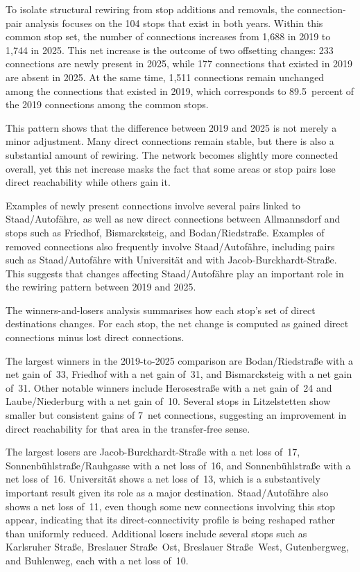 \documentclass[12pt,a4paper,oneside]{report}
\begin{document}
To isolate structural rewiring from stop additions and removals, the connection-pair analysis focuses on the 104 stops that exist in both years.
Within this common stop set, the number of connections increases from 1,688 in 2019 to 1,744 in 2025.
This net increase is the outcome of two offsetting changes: 233 connections are newly present in 2025, while 177 connections that existed in 2019 are absent in 2025.
At the same time, 1,511 connections remain unchanged among the connections that existed in 2019, which corresponds to 89.5~percent of the 2019 connections among the common stops.

This pattern shows that the difference between 2019 and 2025 is not merely a minor adjustment.
Many direct connections remain stable, but there is also a substantial amount of rewiring.
The network becomes slightly more connected overall, yet this net increase masks the fact that some areas or stop pairs lose direct reachability while others gain it.

Examples of newly present connections involve several pairs linked to Staad/Autof\"{a}hre, as well as new direct connections between Allmannsdorf and stops such as Friedhof, Bismarcksteig, and Bodan/Riedstra\ss{}e.
Examples of removed connections also frequently involve Staad/Autof\"{a}hre, including pairs such as Staad/Autof\"{a}hre with Universit\"{a}t and with Jacob-Burckhardt-Stra\ss{}e.
This suggests that changes affecting Staad/Autof\"{a}hre play an important role in the rewiring pattern between 2019 and 2025.

The winners-and-losers analysis summarises how each stop's set of direct destinations changes.
For each stop, the net change is computed as gained direct connections minus lost direct connections.

The largest winners in the 2019-to-2025 comparison are Bodan/Riedstra\ss{}e with a net gain of~33, Friedhof with a net gain of~31, and Bismarcksteig with a net gain of~31.
Other notable winners include Herosestra\ss{}e with a net gain of~24 and Laube/Niederburg with a net gain of~10.
Several stops in Litzelstetten show smaller but consistent gains of 7~net connections, suggesting an improvement in direct reachability for that area in the transfer-free sense.

The largest losers are Jacob-Burckhardt-Stra\ss{}e with a net loss of~17, Sonnenb\"{u}hlstra\ss{}e/Rauhgasse with a net loss of~16, and Sonnenb\"{u}hlstra\ss{}e with a net loss of~16.
Universit\"{a}t shows a net loss of~13, which is a substantively important result given its role as a major destination.
Staad/Autof\"{a}hre also shows a net loss of~11, even though some new connections involving this stop appear, indicating that its direct-connectivity profile is being reshaped rather than uniformly reduced.
Additional losers include several stops such as Karlsruher Stra\ss{}e, Breslauer Stra\ss{}e~Ost, Breslauer Stra\ss{}e~West, Gutenbergweg, and Buhlenweg, each with a net loss of~10.
\end{document}
